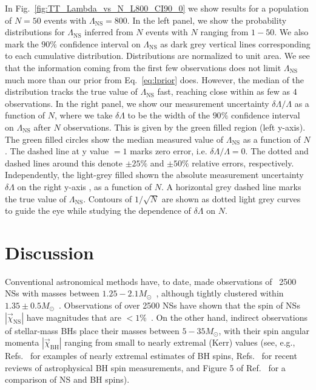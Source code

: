 \documentclass[aps,prd,amsmath,floats,floatfix, twocolumn,
superscriptaddress,nofootinbib,showpacs]{revtex4-1}
\newcommand{\lambdans}{\Lambda_\mathrm{NS}}
\begin{document}
In Fig.~\ref{fig:TT_Lambda_vs_N_L800_CI90_0} we show results for a population
of $N=50$ events with $\lambdans=800$. In the left panel, we show the 
probability distributions for $\lambdans$ inferred from $N$ events with $N$
ranging from $1-50$. We also mark the $90\%$ confidence interval on $\lambdans$
as dark grey vertical lines corresponding to each cumulative distribution.
Distributions are normalized to unit area. We see that the information coming
from the first few observations does not limit $\lambdans$ much more than our
prior from Eq.~\ref{eq:lprior} does. However, the median of the distribution 
tracks the true value of $\lambdans$ fast, reaching close within as few as $4$
observations.
% 
In the right panel, we show our measurement uncertainty $\delta\Lambda/\Lambda$
as a function of $N$, where we take $\delta\Lambda$ to be the width of the 
$90\%$ confidence interval on $\lambdans$ after $N$ observations.
This is given by the green filled region (left y-axis).
The green filled circles show the median measured value of $\lambdans$
as a function of $N$. The dashed line at y value $=1$ marks zero error, i.e.
$\delta\Lambda/\Lambda=0$. The dotted and dashed lines around this denote
$\pm 25\%$ and $\pm 50\%$ relative errors, respectively. Independently, the
light-grey filled shown the absolute measurement uncertainty $\delta\Lambda$
on the right y-axis , as a function of $N$. A horizontal grey dashed line
marks the true value of $\lambdans$. Contours of $1/\sqrt{N}$ are shown as 
dotted light grey curves to guide the eye while studying the dependence of
$\delta\Lambda$ on $N$.
% 







\section{Discussion}\label{s1:discussion}

Conventional astronomical methods have, to date, made observations of ~2500
NSs with masses between $1.25-2.1 M_\odot$~\cite{Lyne:2004cj,
Demorest:2010bx,2013Sci...340..448A,atnfcatalog,mcgillmagnetarcatalog,
stellarcollapsemass}, although
tightly clustered within $1.35\pm0.5M_\odot$~\cite{stellarcollapsemass}.
%
Observations of over 2500 NSs have shown that the spin of NSs
$|\vec{\chi}_\mathrm{NS}|$ have magnitudes that are $<1\%$~\cite{Miller:2014aaa}.
%
On the other hand, indirect observations of stellar-mass BHs place their
masses between $5-35M_\odot$, with their spin angular momenta 
$|\vec{\chi}_\mathrm{BH}|$ ranging from small to nearly extremal (Kerr) values
(see, e.g., Refs.~\cite{McClintockEtAl:2006,Miller:2009cw,Gou:2014una} for 
examples of nearly extremal estimates of BH spins, Refs.~\cite{McClintock:2013vwa,
Reynolds:2013qqa} for recent reviews of astrophysical BH spin measurements,
and Figure 5 of Ref.~\cite{Miller:2014aaa} for a comparison of NS and BH spins).
\end{document}
